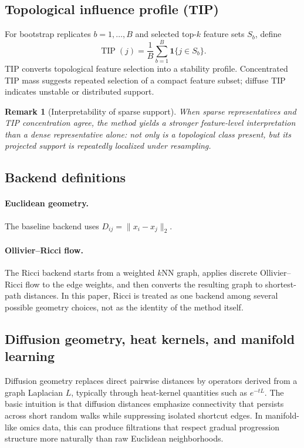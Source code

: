 \documentclass[11pt]{article}
\newtheorem{remark}{Remark}
\begin{document}
\subsection{Topological influence profile (TIP)}
For bootstrap replicates $b=1,\dots,B$ and selected top-$k$ feature sets $S_b$, define
\[
\operatorname{TIP}(j) = \frac{1}{B}\sum_{b=1}^B \mathbf{1}\{j \in S_b\}.
\]
TIP converts topological feature selection into a stability profile. Concentrated TIP mass suggests repeated selection of a compact feature subset; diffuse TIP indicates unstable or distributed support.

\begin{remark}[Interpretability of sparse support]
When sparse representatives and TIP concentration agree, the method yields a stronger feature-level interpretation than a dense representative alone: not only is a topological class present, but its projected support is repeatedly localized under resampling.
\end{remark}

\subsection{Backend definitions}
\paragraph{Euclidean geometry.}
The baseline backend uses $D_{ij}=\|x_i-x_j\|_2$.

\paragraph{Ollivier--Ricci flow.}
The Ricci backend starts from a weighted $k$NN graph, applies discrete Ollivier--Ricci flow to the edge weights, and then converts the resulting graph to shortest-path distances. In this paper, Ricci is treated as one backend among several possible geometry choices, not as the identity of the method itself.

\subsection{Diffusion geometry, heat kernels, and manifold learning}
Diffusion geometry replaces direct pairwise distances by operators derived from a graph Laplacian $L$, typically through heat-kernel quantities such as $e^{-tL}$. The basic intuition is that diffusion distances emphasize connectivity that persists across short random walks while suppressing isolated shortcut edges. In manifold-like omics data, this can produce filtrations that respect gradual progression structure more naturally than raw Euclidean neighborhoods.
\end{document}
